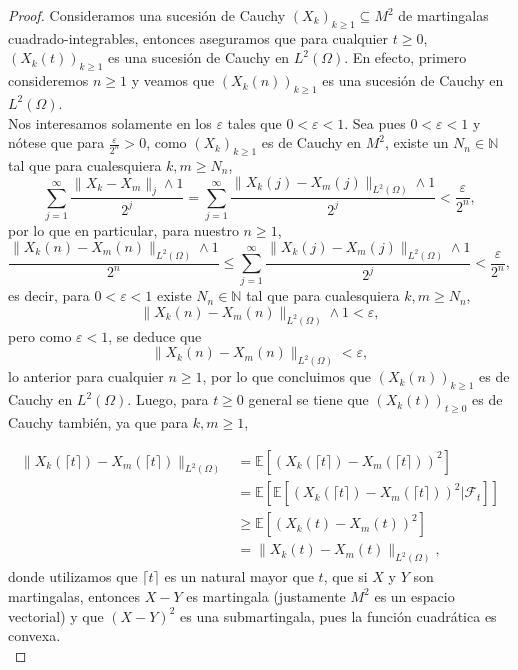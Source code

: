 \documentclass[letterpaper]{article}
\newcommand{\N}{\mathbb N}
\newcommand{\F}{\mathcal{F}}
\newcommand{\E}{\mathbb{E}}
\newcommand{\1}{\mathds{1}}
\theoremstyle{definition}
\theoremstyle{definition}
\theoremstyle{definition}
\theoremstyle{definition}
\theoremstyle{definition}
\begin{document}
\begin{enumerate}
\begin{proof}
        
        Consideramos una sucesión de Cauchy $(X_k)_{k\geq1}\subseteq M^2$ de martingalas cuadrado-integrables, entonces 
        aseguramos que para cualquier $t\geq0$, $(X_k(t))_{k\geq1}$ es una sucesión de Cauchy en $L^2(\Omega)$. En
        efecto, primero consideremos $n\geq1$ y veamos que $(X_k(n))_{k\geq1}$ es una sucesión de Cauchy en $L^2(\Omega)$.\\
        
        Nos interesamos solamente en los $\varepsilon$ tales que $0<\varepsilon<1$. Sea pues $0<\varepsilon<1$ y nótese que para 
        $\frac{\varepsilon}{2^n}>0$, como $(X_k)_{k\geq1}$ es de Cauchy en $M^2$, existe un $N_n\in \N$ tal que para cualesquiera $k,m\geq N_n$,
        \[
        \sum_{j=1}^{\infty} \frac{\|X_k-X_m\|_j\wedge1}{2^j} = \sum_{j=1}^{\infty} \frac{\|X_k(j)-X_m(j)\|_{L^2(\Omega)}\wedge1}{2^j}<\frac{\varepsilon}{2^n}, 
        \]
        por lo que en particular, para nuestro $n\geq1$, 
        \[
            \frac{\|X_k(n)-X_m(n)\|_{L^2(\Omega)}\wedge1}{2^n}\leq \sum_{j=1}^{\infty} \frac{\|X_k(j)-X_m(j)\|_{L^2(\Omega)}\wedge1}{2^j}<\frac{\varepsilon}{2^n},
        \]
        es decir, para $0<\varepsilon<1$ existe $N_n\in \N$ tal que para cualesquiera $k,m\geq N_n$,
        \[
            \|X_k(n)-X_m(n)\|_{L^2(\Omega)}\wedge1<\varepsilon,
        \]
        pero como $\varepsilon<1$, se deduce que 
        \[
            \|X_k(n)-X_m(n)\|_{L^2(\Omega)}<\varepsilon,
        \]
        lo anterior para cualquier $n\geq1$, por lo que concluimos que $(X_k(n))_{k\geq1}$ es de
        Cauchy en $L^2(\Omega)$. Luego, para $t\geq0$ general se tiene que $(X_k(t))_{t\geq0}$ es de Cauchy
        también, ya que para $k,m\geq1$, 
        
        \begin{align*}
            \|X_k(\lceil t \rceil)-X_m(\lceil t \rceil)\|_{L^2(\Omega)}&=\E\left[(X_k(\lceil t \rceil)-X_m(\lceil t \rceil))^2\right]\\
            &=\E\left[\E\left[\left(X_k(\lceil t \rceil)-X_m(\lceil t \rceil)\right)^2|\F_t\right]\right]\\
            &\geq\E\left[\left(X_k(t)-X_m(t)\right)^2\right]\\
            &=\|X_k(t)-X_m(t)\|_{L^2(\Omega)},
        \end{align*}
        donde utilizamos que $\lceil t \rceil$ es un natural mayor que $t$, que si $X$ y $Y$ son 
        martingalas, entonces $X-Y$ es martingala (justamente $M^2$ es un espacio vectorial) y que 
        $(X-Y)^2$ es una submartingala, pues la función cuadrática es convexa.\\
        

\end{proof}
\end{enumerate}
\end{document}
